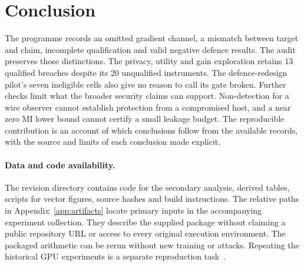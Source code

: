 \section{Conclusion}

The programme records an omitted gradient channel, a mismatch between
target and claim, incomplete qualification and valid negative defence
results. The audit preserves those distinctions. The privacy, utility and
gain exploration retains 13 qualified breaches despite its 20 unqualified
instruments. The defence-redesign pilot's seven ineligible cells also give
no reason to call its gate broken. Further checks limit what the
broader security claims can support. Non-detection for a wire observer
cannot establish protection from a compromised host, and a near zero MI
lower bound cannot certify a small leakage budget. The reproducible
contribution is an account of which conclusions follow from the available
records, with the source and limits of each conclusion made explicit.

\paragraph{Data and code availability.}
The revision directory contains code for the secondary analysis, derived
tables, scripts for vector figures, source hashes and build instructions.
The relative paths in Appendix~\ref{app:artifacts} locate primary inputs
in the accompanying experiment collection. They describe the supplied
package without claiming a public repository URL or access to every
original execution environment. The packaged arithmetic can be rerun
without new training or attacks. Repeating the historical GPU experiments
is a separate reproduction task~\cite{artifacts2026}.
